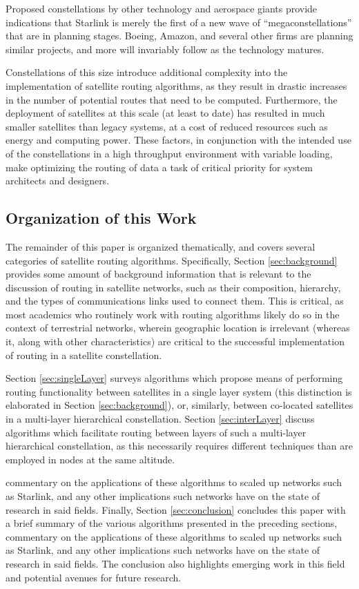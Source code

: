 Proposed constellations by other technology and aerospace giants provide indications that Starlink is merely the first of a new wave of ``megaconstellations'' that are in planning stages. Boeing, Amazon, and several other firms are planning similar projects, and more will invariably follow as the technology matures.

Constellations of this size introduce additional complexity into the implementation of satellite routing algorithms, as they result in drastic increases in the number of potential routes that need to be computed. Furthermore, the deployment of satellites at this scale (at least to date) has resulted in much smaller satellites than legacy systems, at a cost of reduced resources such as energy and computing power. These factors, in conjunction with the intended use of the constellations in a high throughput environment with variable loading, make optimizing the routing of data a task of critical priority for system architects and designers.

\subsection{Organization of this Work}\label{subsec:organization}
The remainder of this paper is organized thematically, and covers several categories of satellite routing algorithms. Specifically, Section \ref{sec:background} provides some amount of background information that is relevant to the discussion of routing in satellite networks, such as their composition, hierarchy, and the types of communications links used to connect them. This is critical, as most academics who routinely work with routing algorithms likely do so in the context of terrestrial networks, wherein geographic location is irrelevant (whereas it, along with other characteristics) are critical to the successful implementation of routing in a satellite constellation. 

Section \ref{sec:singleLayer} surveys algorithms which propose means of performing routing functionality between satellites in a single layer system (this distinction is elaborated in Section \ref{sec:background}), or, similarly, between co-located satellites in a multi-layer hierarchical constellation. Section \ref{sec:interLayer} discuss algorithms which facilitate routing between layers of such a multi-layer hierarchical constellation, as this necessarily requires different techniques than are employed in nodes at the same altitude.  

commentary on the applications of these algorithms to scaled up networks such as Starlink, and any other implications such networks have on the state of research in said fields. Finally, Section \ref{sec:conclusion} concludes this paper with a brief summary of the various algorithms presented in the preceding sections, commentary on the applications of these algorithms to scaled up networks such as Starlink, and any other implications such networks have on the state of research in said fields. The conclusion also highlights emerging work in this field and potential avenues for future research.